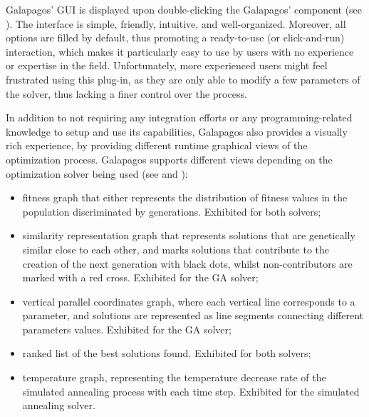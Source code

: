 	Galapagos' \ac{GUI} is displayed upon double-clicking the Galapagos' component (see ). The interface is simple, friendly, intuitive, and well-organized. Moreover, all options are filled by default, thus promoting a ready-to-use (or click-and-run) interaction, which makes it particularly easy to use by users with no experience or expertise in the field. Unfortunately, more experienced users might feel frustrated using this plug-in, as they are only able to modify a few parameters of the solver, thus lacking a finer control over the process. 
	
	In addition to not requiring any integration efforts or any programming-related knowledge to setup and use its capabilities, Galapagos also provides a visually rich experience, by providing different runtime graphical views of the optimization process. Galapagos supports different views depending on the optimization solver being used (see  and ):
	\begin{itemize}
		\item fitness graph that either represents the distribution of fitness values in the population discriminated by generations. Exhibited for both solvers;
		\item similarity representation graph that represents solutions that are genetically similar close to each other, and marks solutions that contribute to the creation of the next generation with black dots, whilst non-contributors are marked with a red cross. Exhibited for the \ac{GA} solver;
		\item vertical parallel coordinates graph, where each vertical line corresponds to a parameter, and solutions are represented as line segments connecting different parameters values. Exhibited for the \ac{GA} solver;
		\item ranked list of the best solutions found. Exhibited for both solvers;
		\item temperature graph, representing the temperature decrease rate of the simulated annealing process with each time step. Exhibited for the simulated annealing solver.
	\end{itemize}
	
